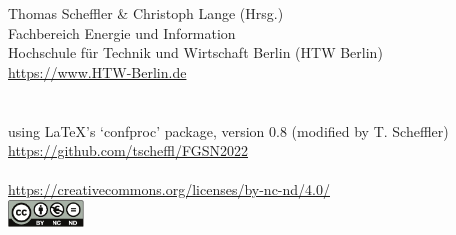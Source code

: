 \documentclass[a4paper,%
  10pt,%
  oneside,%
  onesidepapers,%
  electronic,%
  binding=0mm,%
  papers=countpages,%
  headers=allpages,%
  bib=backref,%
  paperselec=all,%
  onecoltoc,%
  tocnum=right,%
  twocolbib,%
  twocolindex,%
  checktitle=false,%
  checkauthor=false,%
  showpapernumber=false,%
  movepagenumber=true,%
  showmarginlines=false,%
  colorheaders=black,%
  debug=false,%
  verbose=false,%
  pdftk=false,%
  geometry={text={175truemm,226truemm},%
    inner=0.69in,top=23.9mm,bottom=38mm,footskip=10.4mm,voffset=-2.8mm},%
  ]{confproc_22}
\author{\procpdfauthor}
\title{\FGSNxname\\ \FGSNxaddress}
\date{\FGSNxdate}
\renewcommand{\contentsname}{Day-by-Day Conference Program}
\newcommand{\PICTPATH}{pictures/}
\begin{document}
\frontmatter
\setcounter{page}{1}

\renewcommand{\contentsname}{\texorpdfstring{}{Conference Program}}
\newpage
\vspace*{1.7cm}
\thispagestyle{empty}
\\ Thomas Scheffler \& Christoph Lange (Hrsg.)\\ Fachbereich Energie und Information\\
Hochschule für Technik und Wirtschaft Berlin (HTW Berlin)\\
\url{https://www.HTW-Berlin.de}\\
\\
\vspace*{0.35cm}\newline
{}\\
using \LaTeX's `confproc' package, version 0.8 (modified by T. Scheffler)\\
\url{https://github.com/tscheffl/FGSN2022}\\
\vspace*{0.35cm}\newline
{}\\
\url{https://creativecommons.org/licenses/by-nc-nd/4.0/}\\
\includegraphics[width=0.15\textwidth]{pictures/by-nc-nd.eu.pdf} %
\end{document}
